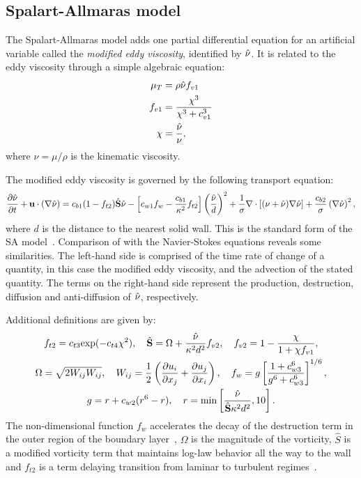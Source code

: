 \subsection{Spalart-Allmaras model}
\label{sec:sa}
The Spalart-Allmaras model adds one partial differential equation for an artificial variable called the \textit{modified eddy viscosity}, identified by $\sa$. It is related to the eddy viscosity through a simple algebraic equation:
\begin{align*}
    \mu_T &= \rho \sa f_{v1}\\
    f_{v1} &= \frac{\chi^3}{\chi^3 + c_{v1}^3}\\
    \chi &= \frac{\sa}{\nu},
\end{align*}
where $\nu = \mu/\rho$ is the kinematic viscosity.

The modified eddy viscosity is governed by the following transport equation:
\begin{equation}
    \pdiff{\sa}{t} + \vec{u}\cdot(\nabla\sa) =
        c_{b1}(1 - f_{t2})\hat{S}\sa
        - \left[
            c_{w1}f_w - \frac{c_{b1}}{\kappa^2}f_{t2}
        \right] \left(
            \frac{\sa}{d}
        \right)^2
        + \frac{1}{\sigma}\nabla\cdot\left[ (\nu + \sa) \nabla\sa \right]
        + \frac{c_{b2}}{\sigma}\left(\nabla \sa\right)^2
        \label{eq:sa},
\end{equation}
where $d$ is the distance to the nearest solid wall. This is the standard form of the SA model~\cite{tmrsa,spalart1994one}.
Comparison of  with the Navier-Stokes equations reveals some similarities. The left-hand side is comprised of the time rate of change of a quantity, in this case the modified eddy viscosity, and the advection of the stated quantity. The terms on the right-hand side represent the production, destruction, diffusion and anti-diffusion of $\sa$, respectively.

Additional definitions are given by:
\begin{gather*}
    f_{t2}  = c_{t3} \text{exp}(-c_{t4}\chi^2), \quad
    \hat{S}  = \Omega + \frac{\sa}{\kappa^2 d^2}f_{v2}, \quad
        f_{v2} = 1 - \frac{\chi}{1 + \chi f_{v1}}, \\
        \Omega = \sqrt{2W_{ij}W_{ij}}, \quad
        W_{ij} = \frac{1}{2}\left(\pdiff{u_i}{x_j} + \pdiff{u_j}{x_i}\right), \quad
    f_{w}  = g \left[
        \frac{1 + c_{w3}^6}{g^6 + c_{w3}^6}
    \right]^{1/6}, \\
        g = r + c_{w2}(r^6 - r), \quad
        r = \text{min}\left[ \frac{\sa}{\hat{S}\kappa^2d^2}, 10 \right].
\end{gather*}
The non-dimensional function $f_w$ accelerates the decay of the destruction term in the outer region of the boundary layer~\cite{spalart1994one}, $\Omega$ is the magnitude of the vorticity, $\hat{S}$ is a modified vorticity term that maintains log-law behavior all the way to the wall and $f_{t2}$ is a term delaying transition from laminar to turbulent regimes~\cite{tmrsa}.

